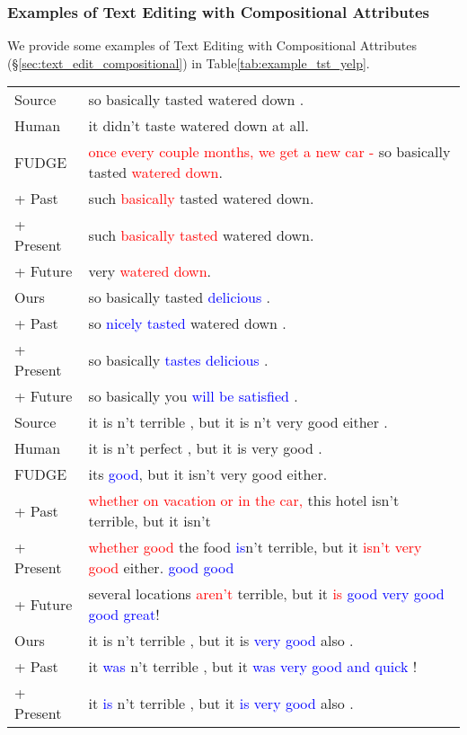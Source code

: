 \documentclass[11pt]{article}
\newcommand{\tenc}[1]{\textcolor{blue}{#1}}
\newcommand{\senc}[1]{\textcolor{red}{#1}}
\begin{document}
\subsubsection{Examples of Text Editing with Compositional Attributes}
\label{app:example_text_edit_compositional}
We provide some examples of Text Editing with Compositional Attributes (\S\ref{sec:text_edit_compositional}) in Table\ref{tab:example_tst_yelp}.
\begin{table}[ht]
    \centering
    \footnotesize
\begin{tabular}{lp{13cm}}
\toprule
Source&so basically tasted watered down .\\
Human&it didn't taste watered down at all.\\
\midrule
FUDGE&\senc{once every couple months, we get a new car - }so basically tasted \senc{watered down}.\\
\quad + Past&such \senc{basically} tasted watered down.\\
\quad + Present&such \senc{basically tasted} watered down.\\
\quad + Future&very \senc{watered down}.\\
\midrule
Ours&so basically tasted \tenc{delicious} .\\
\quad +  Past&so \tenc{nicely tasted} watered down .\\
\quad +  Present&so basically \tenc{tastes delicious} .\\
\quad +  Future&so basically you \tenc{will be satisfied} .\\
\midrule[1pt]
Source&it is n't terrible , but it is n't very good either .\\
Human&it is n't perfect , but it is very good .\\
\midrule
FUDGE&its \tenc{good}, but it isn't very good either.\\
\quad + Past&\senc{whether on vacation or in the car,} this hotel isn't terrible, but it isn't\\
\quad + Present&\senc{whether good} the food \tenc{is}n't terrible, but it \senc{isn't very good} either. \tenc{good good}\\
\quad + Future&several locations \senc{aren't} terrible, but it \senc{is} \tenc{good very good good great}!\\
\midrule
Ours&it is n't terrible , but it is \tenc{very good} also .\\
\quad +  Past&it \tenc{was} n't terrible , but it \tenc{was very good and quick} !\\
\quad +  Present&it \tenc{is} n't terrible , but it \tenc{is very good} also .\\

\end{tabular}
\end{table}
\end{document}
